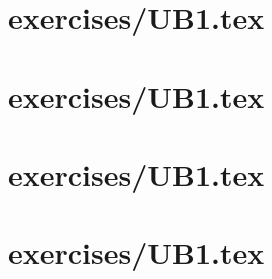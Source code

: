\chapter{exercises/UB1.tex}



\chapter{exercises/UB1.tex}



\chapter{exercises/UB1.tex}



\chapter{exercises/UB1.tex}



